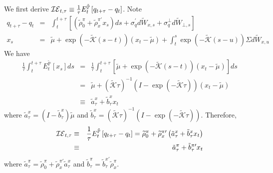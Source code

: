 \documentclass{article}
\begin{document}
We first derive $\mathcal{IE}_{t,\tau }\equiv \frac{1}{\tau }E_{t}^{\mathbb{%
\tilde{P}}}\left[ q_{t+\tau }-q_{t}\right] $. Note 
\begin{eqnarray*}
q_{t+\tau }-q_{t} &=&\int_{t}^{t+\tau }\left[ \left( \widetilde{\rho }%
_{0}^{\pi }+\widetilde{\rho }_{x}^{\pi \prime }x_{s}\right) ds+\sigma
_{q}^{\prime }d\widetilde{W}_{x,s}+\sigma _{q}^{\bot }d\widetilde{W}_{\bot
,s}\right]  \\
x_{s} &=&\widetilde{\mu }+\exp \left( -\widetilde{\mathcal{K}}\left(
s-t\right) \right) \left( x_{t}-\widetilde{\mu }\right) +\int_{t}^{s}\exp
\left( -\widetilde{\mathcal{K}}\left( s-u\right) \right) \Sigma d\widetilde{W%
}_{x,u}
\end{eqnarray*}%
We have%
\begin{eqnarray*}
\frac{1}{\tau }\int_{t}^{t+\tau }E_{t}^{\mathbb{\tilde{P}}}\left[ x_{s}%
\right] ds &=&\frac{1}{\tau }\int_{t}^{t+\tau }\left[ \widetilde{\mu }+\exp
\left( -\widetilde{\mathcal{K}}\left( s-t\right) \right) \left( x_{t}-%
\widetilde{\mu }\right) \right] ds \\
&=&\widetilde{\mu }+\left( \mathcal{\tilde{K}}\tau \right) ^{-1}\left(
I-\exp \left( -\mathcal{\tilde{K}}\tau \right) \right) \left( x_{t}-%
\widetilde{\mu }\right)  \\
&\equiv &\tilde{a}_{\tau }^{x}+\tilde{b}_{\tau }^{x}x_{t}
\end{eqnarray*}%
where $\tilde{a}_{\tau }^{x}=\left( I-\tilde{b}_{\tau }^{x}\right) \tilde{\mu%
}$ and $\tilde{b}_{\tau }^{x}=\left( \mathcal{\tilde{K}}\tau \right)
^{-1}\left( I-\exp \left( -\mathcal{\tilde{K}}\tau \right) \right) $.
Therefore,%
\begin{eqnarray*}
\mathcal{IE}_{t,\tau } &\equiv &\frac{1}{\tau }E_{t}^{\mathbb{\tilde{P}}}%
\left[ q_{t+\tau }-q_{t}\right] =\widetilde{\rho }_{0}^{\pi }+\widetilde{%
\rho }_{x}^{\pi \prime }\left( \tilde{a}_{\tau }^{x}+\tilde{b}_{\tau
}^{x}x_{t}\right)  \\
&\equiv &\tilde{a}_{\tau }^{\pi }+\tilde{b}_{\tau }^{\pi \prime }x_{t}
\end{eqnarray*}%
where $\tilde{a}_{\tau }^{\pi }=\widetilde{\rho }_{0}^{\pi }+\widetilde{\rho 
}_{x}^{\pi \prime }\tilde{a}_{\tau }^{x}$ and $\tilde{b}_{\tau }^{\pi }=%
\tilde{b}_{\tau }^{x\prime }\widetilde{\rho }_{x}^{\pi }$. 
\end{document}
